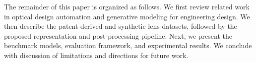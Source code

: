 The remainder of this paper is organized as follows. We first review related work in optical design automation and generative modeling for engineering design. We then describe the patent-derived and synthetic lens datasets, followed by the proposed representation and post-processing pipeline. Next, we present the benchmark models, evaluation framework, and experimental results. We conclude with discussion of limitations and directions for future work.
